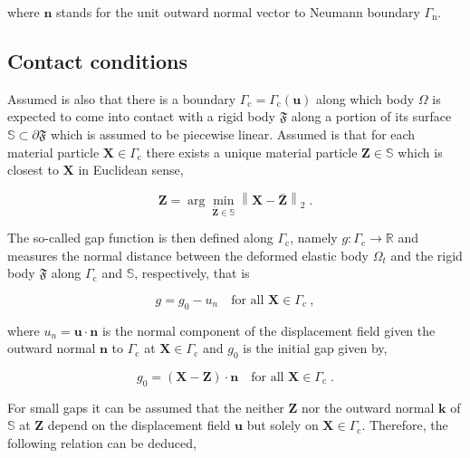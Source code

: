 \documentclass[10pt,a4paper]{article}
\begin{document}
where $\mathbf{n}$ stands for the unit outward normal vector to Neumann boundary $\Gamma_{\text{n}}$.

\subsection{Contact conditions}\label{subsec:contact_conditions}

Assumed is also that there is a boundary $\Gamma_{\text{c}} = \Gamma_{\text{c}} (\mathbf{u})$ along which body $\Omega$ is expected to come into contact with a rigid body $\mathfrak{F}$ along a portion of its surface $\mathbb{S} \subset \partial \mathfrak{F}$ which is assumed to be piecewise linear. Assumed is that for each material particle $\mathbf{X} \in \Gamma_{\text{c}}$ there exists a unique material particle $\mathbf{Z} \in \mathbb{S}$ which is closest to $\mathbf{X}$ in Euclidean sense,

\begin{equation}
	\mathbf{Z} = \arg \min_{\bar{\mathbf{Z}} \in \mathbb{S}} \left\| \mathbf{X} - \bar{\mathbf{Z}} \right\|_2 \;. \label{eq:euclidean_distance}
\end{equation}

The so-called gap function is then defined along $\Gamma_{\text{c}}$, namely $g:\Gamma_{\text{c}} \rightarrow \mathbb{R}$ and measures the normal distance between the deformed elastic body $\Omega_t$ and the rigid body $\mathfrak{F}$ along $\Gamma_{\text{c}}$ and $\mathbb{S}$, respectively, that is

\begin{equation}
	g = g_0 - u_n \quad \text{for all }\mathbf{X} \in \Gamma_{\text{c}} \:, \label{eq:gap_function}
\end{equation}

where $u_n = \mathbf{u} \cdot\mathbf{n}$ is the normal component of the displacement field given the outward normal $\mathbf{n}$ to $\Gamma_{\text{c}}$ at $\mathbf{X} \in \Gamma_{\text{c}}$ and $g_0$ is the initial gap given by,

\begin{equation}
	g_0 = \left( \mathbf{X} - \mathbf{Z} \right) \cdot \mathbf{n} \quad \text{for all }\mathbf{X} \in \Gamma_{\text{c}} \;. \label{eq:initial_gap}
\end{equation}

For small gaps it can be assumed that the neither $\mathbf{Z}$ nor the outward normal $\mathbf{k}$ of $\mathbb{S}$ at $\mathbf{Z}$ depend on the displacement field $\mathbf{u}$ but solely on $\mathbf{X} \in \Gamma_{\text{c}}$. Therefore, the following relation can be deduced,
\end{document}

